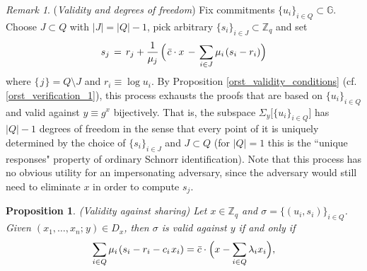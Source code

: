 \documentclass[psamsfonts, reqno]{amsart}
\newtheorem{prop}[thm]{Proposition}
\theoremstyle{definition}
\theoremstyle{remark}
\newtheorem{rem}[thm]{Remark}
\numberwithin{equation}{section}
\begin{document}
\begin{rem}\label{orst_validity_degrees_of_freedom}
(\textit{Validity and degrees of freedom})
Fix commitments $\{u_i\}_{i \in Q} \subset \mathbb{G}$.
Choose $J \subset Q$ with $|J| = |Q| - 1$,
pick arbitrary $\{s_i\}_{i \in J} \subset \mathbb{Z}_q$
and set
\vspace{5pt}
\begin{equation*}\label{orst_validity_degrees_of_freedom_formula}
s_j
	\hspace{1.5pt}
	=
	\hspace{1.5pt}
	r_j + \frac{1}{\mu_j}
	\hspace{1.5pt}
	\Big(
		\hspace{1.0pt}
		\bar{c}\cdot x
		\hspace{1.5pt}
		-
		\hspace{1.5pt}
		\sum_{i \in J}
			\mu_i
			\hspace{1pt}
			(s_i - r_i)
	\Big)
\vspace{5pt}
\end{equation*}
where $\{\hspace{1pt}j\hspace{1pt}\} = Q \setminus J$
and $r_i \equiv \log u_i$.
By Proposition \ref{orst_validity_conditions}
(cf. \eqref{orst_verification_1}),
this process exhausts the proofs that are
based on $\{u_i\}_{i \in Q}$ and valid against
$y \equiv g ^ x$
bijectively.
That is, the subspace
$\Sigma_y \big[\{u_i\}_{i \in Q}\big]$
has $|Q| - 1$ degrees of freedom in the sense that
every point of it is uniquely determined
by the choice of $\{s_i\}_{i \in J}$
and $J \subset Q$ (for $|Q| = 1$
this is the ``unique responses" property
of ordinary Schnorr identification).
Note that this process has no obvious utility
for an impersonating adversary,
since the adversary would still need
to eliminate $x$ in order to compute $s_j$.
\end{rem}

\begin{prop}\label{orst_validity_against_sharing_prop}
\textup{(\textit{Validity against sharing})}
Let $x \in \mathbb{Z}_q$ and
$\sigma = \{(u_i, s_i)\}_{i \in Q}$.
Given $(x_1, \dots, x_n;\hspace{1pt} y) \in D_x$,
then $\sigma$ is valid against $y$ if and only if
\vspace{5pt}
\begin{equation}\label{orst_validity_against_sharing}
\sum_{i \in Q} \mu_i\hspace{1pt} (s_i - r_i - c_i\hspace{1pt}x_i)
=
\bar{c} \cdot \Big(x - \sum_{i \in Q} \lambda_i x_i\Big),
\vspace{5pt}
\end{equation}
\end{prop}
\end{document}
